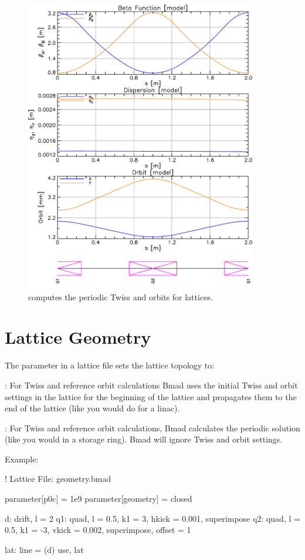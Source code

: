 \documentclass{hitec}
\newcommand{\Section}[1]{\section{#1}\vspace*{-1ex}}
\begin{document}
\begin{figure}[tb]
  \centering
  \includegraphics[width=0.9\textwidth]{geometry.pdf}
  \caption{\bmad computes the periodic Twiss and orbits for  lattices.}
  \label{f:geometry}
\end{figure}

\Section{Lattice Geometry}

The  parameter in a lattice file sets the lattice topology to:
\begin{description}
\item {}: For Twiss and reference orbit calculations Bmad uses the initial Twiss 
and orbit settings in the lattice for the beginning of the lattice and
propagates them to the end of the lattice (like you would do for a linac). 
\item {}: For Twiss and reference orbit calculations, Bmad calculates the 
periodic solution (like you would in a storage ring). 
Bmad will ignore Twiss and orbit settings.
\end{description}

Example:
\begin{code}
! Lattice File: geometry.bmad

parameter[p0c] = 1e9
parameter[geometry] = closed

d: drift, l = 2
q1: quad, l = 0.5, k1 = 3, hkick = 0.001, superimpose
q2: quad, l = 0.5, k1 = -3, vkick = 0.002, superimpose, offset = 1

lat: line = (d)
use, lat
\end{code}
\end{document}
